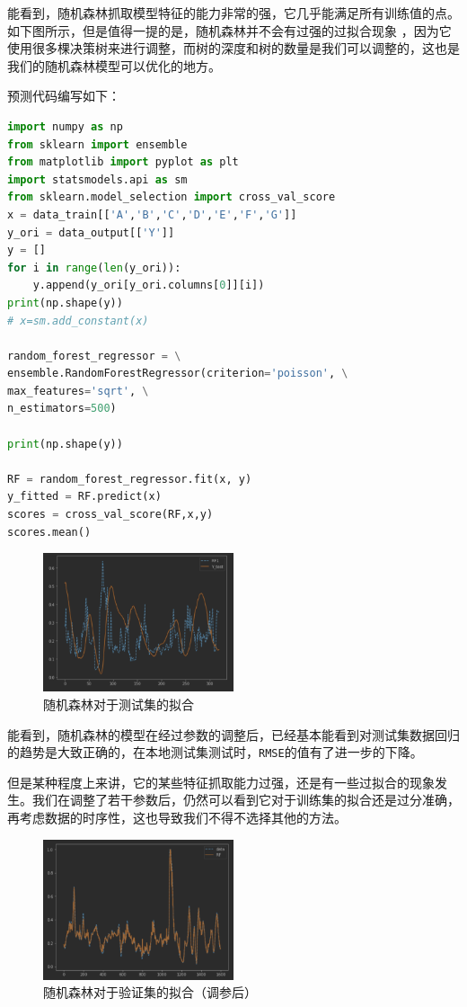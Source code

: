 \documentclass[11pt,a4paper]{elegantpaper}
\begin{document}
\begin{multicols}{2}
能看到，随机森林抓取模型特征的能力非常的强，它几乎能满足所有训练值的点。如下图所示，但是值得一提的是，随机森林并不会有过强的过拟合现象
，因为它使用很多棵决策树来进行调整，而树的深度和树的数量是我们可以调整的，这也是我们的随机森林模型可以优化的地方。

预测代码编写如下：

\begin{lstlisting}[language=Python]
import numpy as np
from sklearn import ensemble
from matplotlib import pyplot as plt
import statsmodels.api as sm
from sklearn.model_selection import cross_val_score
x = data_train[['A','B','C','D','E','F','G']]
y_ori = data_output[['Y']]
y = []
for i in range(len(y_ori)):
    y.append(y_ori[y_ori.columns[0]][i])
print(np.shape(y))
# x=sm.add_constant(x)

random_forest_regressor = \
ensemble.RandomForestRegressor(criterion='poisson', \
max_features='sqrt', \
n_estimators=500)

print(np.shape(y))

RF = random_forest_regressor.fit(x, y)
y_fitted = RF.predict(x)
scores = cross_val_score(RF,x,y)
scores.mean()
\end{lstlisting}


\begin{figure}[H]
  \centering
  \includegraphics[width=0.5\textwidth]{images/FFFFF.png}
  \caption{随机森林对于测试集的拟合} 
\end{figure}

能看到，随机森林的模型在经过参数的调整后，已经基本能看到对测试集数据回归的趋势是大致正确的，在本地测试集测试时，\lstinline{RMSE}的值有了进一步的下降。

但是某种程度上来讲，它的某些特征抓取能力过强，还是有一些过拟合的现象发生。我们在调整了若干参数后，仍然可以看到它对于训练集的拟合还是过分准确，再考虑数据的时序性，这也导致我们不得不选择其他的方法。

\begin{figure}[H]
  \centering
  \includegraphics[width=0.5\textwidth]{images/FFFFFF.png}
  \caption{随机森林对于验证集的拟合（调参后）} 
\end{figure}


\end{multicols}
\end{document}

